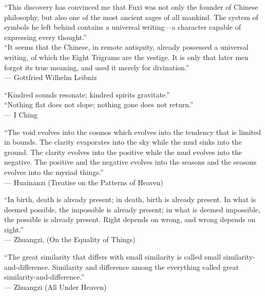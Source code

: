 \begin{titlepage}
\begin{minipage}{\textwidth}
``This discovery has convinced me that Fuxi was not only the founder of Chinese philosophy, but also one of the most ancient sages of all mankind. The system of symbols he left behind contains a universal writing---a character capable of expressing every thought.'' \\[3pt]
``It seems that the Chinese, in remote antiquity, already possessed a universal writing, of which the Eight Trigrams are the vestige. It is only that later men forgot its true meaning, and used it merely for divination.'' \\[3pt]
— Gottfried Wilhelm Leibniz\par
\vspace{8pt}

``Kindred sounds resonate; kindred spirits gravitate.'' \\[3pt]
``Nothing flat does not slope; nothing gone does not return.'' \\[3pt]
— I Ching\par
\vspace{8pt}

``The void evolves into the cosmos which evolves into the tendency that is limited in bounds. The clarity evaporates into the sky while the mud sinks into the ground. The clarity evolves into the positive while the mud evolves into the negative. The positive and the negative evolves into the seasons and the seasons evolves into the myriad things.'' \\[3pt]
— Huainanzi (Treatise on the Patterns of Heaven)\par
\vspace{8pt}

{\upshape
``In birth, death is already present; in death, birth is already present. In what is deemed possible, the impossible is already present; in what is deemed impossible, the possible is already present. Right depends on wrong, and wrong depends on right.'' \\[3pt]
— Zhuangzi, (On the Equality of Things)\par}
\vspace{8pt}

``The great similarity that differs with small similarity is called small similarity-and-difference. Similarity and difference among the everything called great similarity-and-difference.'' \\[3pt]
— Zhuangzi (All Under Heaven)\par
\end{minipage}\par
\endgroup

\vfill
\end{titlepage}